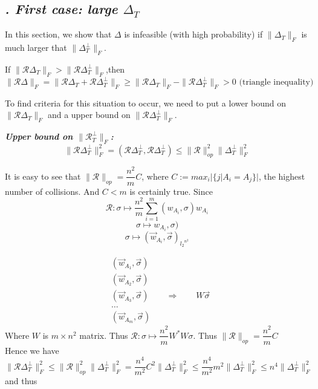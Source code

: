 \documentclass{article}
\begin{document}
\subsection{\textit{\uppercase\expandafter{}. First case: large $\Delta_T$}}
In this section, we show that $\Delta$ is infeasible (with high probability) if $\|\Delta_T\|_F$ is much larger that $\|\Delta_T^\perp\|_F$.

If $\|\mathcal{R}\Delta_T\|_F>\|\mathcal{R}\Delta_T^\perp\|_F$,then
\[
\|\mathcal{R}\Delta\|_F = \|\mathcal{R}\Delta_T+\mathcal{R}\Delta_T^\perp\|_F \ge \|\mathcal{R}\Delta_T\|_F - \|\mathcal{R}\Delta_T^\perp\|_F >0 \text{ (triangle inequality)}
\]

To find criteria for this situation to occur, we need to put a lower bound on $\|\mathcal{R}\Delta_T\|_F$ and a upper bound on $\|\mathcal{R}\Delta_T^\perp\|_F$.

\textit{\textbf{Upper bound on $\|\mathcal{R}_T^\perp\|_F$:}} 
\begin{equation}
\|\mathcal{R}\Delta_T^\perp\|_F^2 = (\mathcal{R}\Delta_T^\perp,\mathcal{R}\Delta_T^\perp) \le \|\mathcal{R}\|_{op}^2\|\Delta_T^\perp\|^2_F
\end{equation}

{\color{red}It is easy to see that $\|\mathcal{R}\|_{op}=\dfrac{n^2}{m}C$,  where $C := max_i|\lbrace j|A_i = A_j\rbrace|$, the highest number of collisions.} And $C<m$ is certainly true. Since 
\[
\mathcal{R}:\sigma \mapsto \dfrac{n^2}{m}\sum_{i=1}^m(w_{A_i},\sigma)w_{A_i}\]
\[\sigma \mapsto w_{A_i},\sigma)\]
\[
\sigma \mapsto (\overrightarrow{w}_{A_i},\overrightarrow{\sigma})_{{l_2}^{n^2}}\]


\begin{align*}
&(\overrightarrow{w}_{A_1},\overrightarrow{\sigma})\\
&(\overrightarrow{w}_{A_2},\overrightarrow{\sigma})\\
&(\overrightarrow{w}_{A_{3}},\overrightarrow{\sigma}) \qquad\Rightarrow \qquad W\overrightarrow{\sigma}\\
&\dots\\
&(\overrightarrow{w}_{A_m},\overrightarrow{\sigma}) 
\end{align*}
Where $W$ is $m\times{n^2}$ matrix.
Thus $\mathcal{R}:\sigma \mapsto \dfrac{n^2}{m} W^*W\sigma$.
Thus $\|\mathcal{R}\|_{op}=\dfrac{n^2}{m}C$ 
\\[2ex]
Hence we have 
\[
\|\mathcal{R}\Delta_T^\perp\|_F^2
\le \|\mathcal{R}\|_{op}^2\|\Delta_T^\perp\|^2_F 
= \dfrac{n^4}{m^2}C^2\|\Delta_T^\perp\|^2_F
\le \dfrac{n^4}{m^2} m^2\|\Delta_T^\perp\|^2_F
\le n^4 \|\Delta_T^\perp\|_F^2
\]
and thus 
\end{document}

